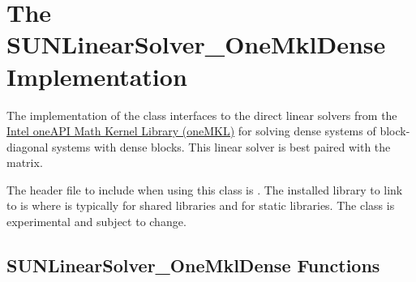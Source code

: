 \section{The SUNLinearSolver\_OneMklDense Implementation}
\label{ss:sunlinsol_onemkldense}

The  implementation of the {\sunlinsol} class
interfaces to the direct linear solvers from the
\href{https://software.intel.com/content/www/us/en/develop/tools/oneapi/components/onemkl.html}{Intel oneAPI Math Kernel Library (oneMKL)}
for solving dense systems of block-diagonal systems with dense blocks. This
linear solver is best paired with the  matrix.

The header file to include when using this class is
. The installed library to link to is
 where  is
typically  for shared libraries and  for static libraries.
\newline
\newline
{\warn}The  class is experimental and subject
to change.


\subsection{SUNLinearSolver\_OneMklDense Functions}
\label{ss:sunlinsol_onemkldense_functions}

